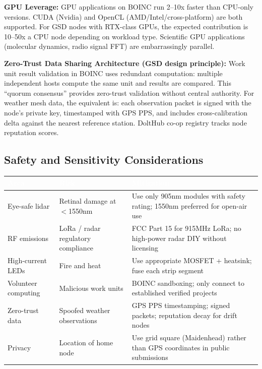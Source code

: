 \documentclass[11pt,letterpaper]{article}
\newcommand{\tableheader}[1]{\textbf{\sffamily\textcolor{white}{#1}}}
\begin{document}
\textbf{GPU Leverage:} GPU applications on BOINC run 2--10x faster than CPU-only versions. CUDA (Nvidia) and OpenCL (AMD/Intel/cross-platform) are both supported. For GSD nodes with RTX-class GPUs, the expected contribution is 10--50x a CPU node depending on workload type. Scientific GPU applications (molecular dynamics, radio signal FFT) are embarrassingly parallel.

\textbf{Zero-Trust Data Sharing Architecture (GSD design principle):} Work unit result validation in BOINC uses redundant computation: multiple independent hosts compute the same unit and results are compared. This ``quorum consensus'' provides zero-trust validation without central authority. For weather mesh data, the equivalent is: each observation packet is signed with the node's private key, timestamped with GPS PPS, and includes cross-calibration delta against the nearest reference station. DoltHub co-op registry tracks node reputation scores.

\subsection{Safety and Sensitivity Considerations}

\begin{center}
\begin{tabularx}{\textwidth}{L{4cm}L{4cm}X}
\toprule
{}
\tableheader{Area} & \tableheader{Risk} & \tableheader{Mitigation} \\
\midrule
Eye-safe lidar & Retinal damage at $<$1550nm & Use only 905nm modules with safety rating; 1550nm preferred for open-air use \\
RF emissions & LoRa / radar regulatory compliance & FCC Part 15 for 915MHz LoRa; no high-power radar DIY without licensing \\
High-current LEDs & Fire and heat & Use appropriate MOSFET + heatsink; fuse each strip segment \\
Volunteer computing & Malicious work units & BOINC sandboxing; only connect to established verified projects \\
Zero-trust data & Spoofed weather observations & GPS PPS timestamping; signed packets; reputation decay for drift nodes \\
Privacy & Location of home node & Use grid square (Maidenhead) rather than GPS coordinates in public submissions \\
\bottomrule
\end{tabularx}
\end{center}
\end{document}
